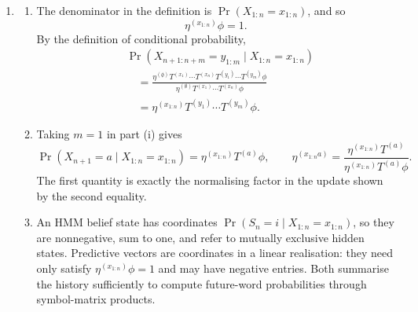 \begin{solution}[ex:p3-4]
\begin{enumerate}
      \item
        \begin{enumerate}
          \item The denominator in the definition is
            $\Pr(X_{1:n}=x_{1:n})$, and so
            \[
              \eta^{(x_{1:n})}\phi=1.
            \]
            By the definition of conditional probability,
            \[
              \begin{aligned}
                &\Pr(X_{n+1:n+m}=y_{1:m}\mid X_{1:n}=x_{1:n})\\
                &\quad=
                  \frac{\eta^{(\emptyset)}
                    T^{(x_1)}\cdots T^{(x_n)}
                    T^{(y_1)}\cdots T^{(y_m)}\phi}
                  {\eta^{(\emptyset)}
                    T^{(x_1)}\cdots T^{(x_n)}\phi}\\
                &\quad=
                  \eta^{(x_{1:n})}
                    T^{(y_1)}\cdots T^{(y_m)}\phi.
              \end{aligned}
            \]

          \item Taking $m=1$ in part (i) gives
            \[
              \Pr(X_{n+1}=a\mid X_{1:n}=x_{1:n})
                =\eta^{(x_{1:n})}T^{(a)}\phi,
              \qquad
              \eta^{(x_{1:n}a)}
                =\frac{\eta^{(x_{1:n})}T^{(a)}}
                  {\eta^{(x_{1:n})}T^{(a)}\phi}.
            \]
            The first quantity is exactly the normalising factor in the
            update shown by the second equality.

          \item An HMM belief state has coordinates
            $\Pr(S_n=i\mid X_{1:n}=x_{1:n})$, so they are nonnegative, sum to
            one, and refer to mutually exclusive hidden states. Predictive
            vectors are coordinates in a linear realisation: they need only
            satisfy $\eta^{(x_{1:n})}\phi=1$ and may have negative entries.
            Both summarise the history sufficiently to compute future-word
            probabilities through symbol-matrix products.
        \end{enumerate}


\end{enumerate}
\end{solution}
